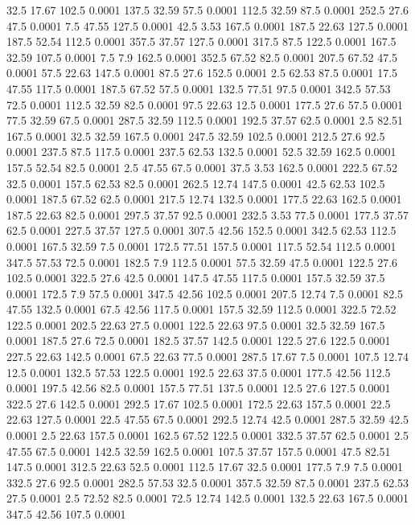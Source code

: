 32.5	17.67	102.5	0.0001
137.5	32.59	57.5	0.0001
112.5	32.59	87.5	0.0001
252.5	27.6	47.5	0.0001
7.5	47.55	127.5	0.0001
42.5	3.53	167.5	0.0001
187.5	22.63	127.5	0.0001
187.5	52.54	112.5	0.0001
357.5	37.57	127.5	0.0001
317.5	87.5	122.5	0.0001
167.5	32.59	107.5	0.0001
7.5	7.9	162.5	0.0001
352.5	67.52	82.5	0.0001
207.5	67.52	47.5	0.0001
57.5	22.63	147.5	0.0001
87.5	27.6	152.5	0.0001
2.5	62.53	87.5	0.0001
17.5	47.55	117.5	0.0001
187.5	67.52	57.5	0.0001
132.5	77.51	97.5	0.0001
342.5	57.53	72.5	0.0001
112.5	32.59	82.5	0.0001
97.5	22.63	12.5	0.0001
177.5	27.6	57.5	0.0001
77.5	32.59	67.5	0.0001
287.5	32.59	112.5	0.0001
192.5	37.57	62.5	0.0001
2.5	82.51	167.5	0.0001
32.5	32.59	167.5	0.0001
247.5	32.59	102.5	0.0001
212.5	27.6	92.5	0.0001
237.5	87.5	117.5	0.0001
237.5	62.53	132.5	0.0001
52.5	32.59	162.5	0.0001
157.5	52.54	82.5	0.0001
2.5	47.55	67.5	0.0001
37.5	3.53	162.5	0.0001
222.5	67.52	32.5	0.0001
157.5	62.53	82.5	0.0001
262.5	12.74	147.5	0.0001
42.5	62.53	102.5	0.0001
187.5	67.52	62.5	0.0001
217.5	12.74	132.5	0.0001
177.5	22.63	162.5	0.0001
187.5	22.63	82.5	0.0001
297.5	37.57	92.5	0.0001
232.5	3.53	77.5	0.0001
177.5	37.57	62.5	0.0001
227.5	37.57	127.5	0.0001
307.5	42.56	152.5	0.0001
342.5	62.53	112.5	0.0001
167.5	32.59	7.5	0.0001
172.5	77.51	157.5	0.0001
117.5	52.54	112.5	0.0001
347.5	57.53	72.5	0.0001
182.5	7.9	112.5	0.0001
57.5	32.59	47.5	0.0001
122.5	27.6	102.5	0.0001
322.5	27.6	42.5	0.0001
147.5	47.55	117.5	0.0001
157.5	32.59	37.5	0.0001
172.5	7.9	57.5	0.0001
347.5	42.56	102.5	0.0001
207.5	12.74	7.5	0.0001
82.5	47.55	132.5	0.0001
67.5	42.56	117.5	0.0001
157.5	32.59	112.5	0.0001
322.5	72.52	122.5	0.0001
202.5	22.63	27.5	0.0001
122.5	22.63	97.5	0.0001
32.5	32.59	167.5	0.0001
187.5	27.6	72.5	0.0001
182.5	37.57	142.5	0.0001
122.5	27.6	122.5	0.0001
227.5	22.63	142.5	0.0001
67.5	22.63	77.5	0.0001
287.5	17.67	7.5	0.0001
107.5	12.74	12.5	0.0001
132.5	57.53	122.5	0.0001
192.5	22.63	37.5	0.0001
177.5	42.56	112.5	0.0001
197.5	42.56	82.5	0.0001
157.5	77.51	137.5	0.0001
12.5	27.6	127.5	0.0001
322.5	27.6	142.5	0.0001
292.5	17.67	102.5	0.0001
172.5	22.63	157.5	0.0001
22.5	22.63	127.5	0.0001
22.5	47.55	67.5	0.0001
292.5	12.74	42.5	0.0001
287.5	32.59	42.5	0.0001
2.5	22.63	157.5	0.0001
162.5	67.52	122.5	0.0001
332.5	37.57	62.5	0.0001
2.5	47.55	67.5	0.0001
142.5	32.59	162.5	0.0001
107.5	37.57	157.5	0.0001
47.5	82.51	147.5	0.0001
312.5	22.63	52.5	0.0001
112.5	17.67	32.5	0.0001
177.5	7.9	7.5	0.0001
332.5	27.6	92.5	0.0001
282.5	57.53	32.5	0.0001
357.5	32.59	87.5	0.0001
237.5	62.53	27.5	0.0001
2.5	72.52	82.5	0.0001
72.5	12.74	142.5	0.0001
132.5	22.63	167.5	0.0001
347.5	42.56	107.5	0.0001
